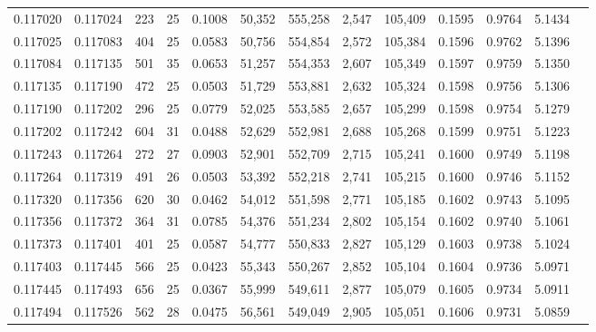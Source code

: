 \begin{tabular}{rrrrrrrrrrrrr}
0.117020 & 0.117024 & 223 &  25 &                                     0.1008 &  50,352 & 555,258 &   2,547 & 105,409 & 0.1595 & 0.9764 & 5.1434 \\
0.117025 & 0.117083 & 404 &  25 &                                     0.0583 &  50,756 & 554,854 &   2,572 & 105,384 & 0.1596 & 0.9762 & 5.1396 \\
0.117084 & 0.117135 & 501 &  35 &                                     0.0653 &  51,257 & 554,353 &   2,607 & 105,349 & 0.1597 & 0.9759 & 5.1350 \\
0.117135 & 0.117190 & 472 &  25 &                                     0.0503 &  51,729 & 553,881 &   2,632 & 105,324 & 0.1598 & 0.9756 & 5.1306 \\
0.117190 & 0.117202 & 296 &  25 &                                     0.0779 &  52,025 & 553,585 &   2,657 & 105,299 & 0.1598 & 0.9754 & 5.1279 \\
0.117202 & 0.117242 & 604 &  31 &                                     0.0488 &  52,629 & 552,981 &   2,688 & 105,268 & 0.1599 & 0.9751 & 5.1223 \\
0.117243 & 0.117264 & 272 &  27 &                                     0.0903 &  52,901 & 552,709 &   2,715 & 105,241 & 0.1600 & 0.9749 & 5.1198 \\
0.117264 & 0.117319 & 491 &  26 &                                     0.0503 &  53,392 & 552,218 &   2,741 & 105,215 & 0.1600 & 0.9746 & 5.1152 \\
0.117320 & 0.117356 & 620 &  30 &                                     0.0462 &  54,012 & 551,598 &   2,771 & 105,185 & 0.1602 & 0.9743 & 5.1095 \\
0.117356 & 0.117372 & 364 &  31 &                                     0.0785 &  54,376 & 551,234 &   2,802 & 105,154 & 0.1602 & 0.9740 & 5.1061 \\
0.117373 & 0.117401 & 401 &  25 &                                     0.0587 &  54,777 & 550,833 &   2,827 & 105,129 & 0.1603 & 0.9738 & 5.1024 \\
0.117403 & 0.117445 & 566 &  25 &                                     0.0423 &  55,343 & 550,267 &   2,852 & 105,104 & 0.1604 & 0.9736 & 5.0971 \\
0.117445 & 0.117493 & 656 &  25 &                                     0.0367 &  55,999 & 549,611 &   2,877 & 105,079 & 0.1605 & 0.9734 & 5.0911 \\
0.117494 & 0.117526 & 562 &  28 &                                     0.0475 &  56,561 & 549,049 &   2,905 & 105,051 & 0.1606 & 0.9731 & 5.0859 \\

\end{tabular}
